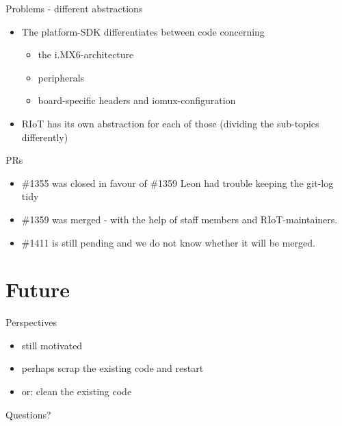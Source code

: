 \documentclass[9pt]{beamer}
\begin{document}
\begin{frame}{Problems - different abstractions}
 \begin{itemize}
 \item The platform-SDK differentiates between code concerning
 	\begin{itemize}
 	\item the i.MX6-architecture
 	\item peripherals
 	\item board-specific headers and iomux-configuration
 	\end{itemize}
 \item RIoT has its own abstraction for each of those (dividing the sub-topics differently)
 \end{itemize}
\end{frame}

\begin{frame}{PRs}
 \begin{itemize}
 \item \#1355 was closed in favour of \#1359 \textcolor{light-gray}{Leon had trouble keeping the git-log tidy}
 \item \#1359 was merged - with the help of staff members and RIoT-maintainers.
 \item \#1411 is still pending and we do not know whether it will be merged.
 \end{itemize}
\end{frame}

\section{Future}

\begin{frame}{Perspectives}
 \begin{itemize}
 \item still motivated
 \item perhaps scrap the existing code and restart
 \item or: clean the existing code
 \end{itemize}
\end{frame}

\begin{frame}{Questions?}

\end{frame}
\end{document}
